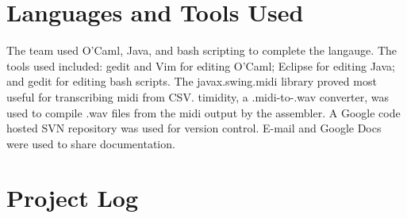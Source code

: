 \documentclass[12pt,A4]{book}
\begin{document}
\section{Languages and Tools Used}
The team used O'Caml, Java, and bash scripting to complete the langauge. The tools used included: gedit and Vim for editing O'Caml; Eclipse for editing Java; and gedit for editing bash scripts. The javax.swing.midi library proved most useful for transcribing midi from CSV. timidity, a .midi-to-.wav converter, was used to compile .wav files from the midi output by the assembler. A Google code hosted SVN repository was used for version control. E-mail and Google Docs were used to share documentation.

\section{Project Log}
\end{document}

